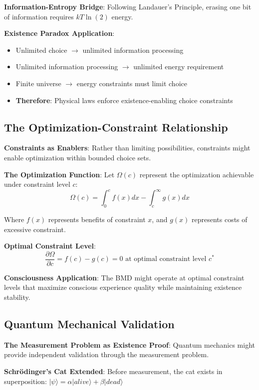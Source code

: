 \documentclass[12pt]{article}
\begin{document}
\textbf{Information-Entropy Bridge}: Following Landauer's Principle, erasing one bit of information requires $kT \ln(2)$ energy.

\textbf{Existence Paradox Application}:
\begin{itemize}
\item Unlimited choice $\rightarrow$ unlimited information processing
\item Unlimited information processing $\rightarrow$ unlimited energy requirement
\item Finite universe $\rightarrow$ energy constraints must limit choice
\item \textbf{Therefore}: Physical laws enforce existence-enabling choice constraints
\end{itemize}

\subsection{The Optimization-Constraint Relationship}

\textbf{Constraints as Enablers}: Rather than limiting possibilities, constraints might enable optimization within bounded choice sets.

\textbf{The Optimization Function}:
Let $\Omega(c)$ represent the optimization achievable under constraint level $c$:
$$\Omega(c) = \int_0^c f(x)dx - \int_c^{\infty} g(x)dx$$

Where $f(x)$ represents benefits of constraint $x$, and $g(x)$ represents costs of excessive constraint.

\textbf{Optimal Constraint Level}:
$$\frac{\partial\Omega}{\partial c} = f(c) - g(c) = 0 \text{ at optimal constraint level } c^*$$

\textbf{Consciousness Application}: The BMD might operate at optimal constraint levels that maximize conscious experience quality while maintaining existence stability.

\subsection{Quantum Mechanical Validation}

\textbf{The Measurement Problem as Existence Proof}: Quantum mechanics might provide independent validation through the measurement problem.

\textbf{Schrödinger's Cat Extended}: Before measurement, the cat exists in superposition: $|\psi\rangle = \alpha|alive\rangle + \beta|dead\rangle$
\end{document}
